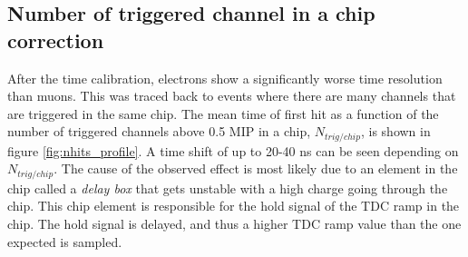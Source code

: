 \documentclass{JINST}
\begin{document}
\subsection{Number of triggered channel in a chip correction}
\label{sec:NumberTrigger}

After the time calibration, electrons show a significantly worse time resolution than muons. This was traced back to events where there are many channels that are triggered in the same chip. The mean time of first hit as a function of the number of triggered channels above 0.5 MIP in a chip, $N_{trig/chip}$, is shown in figure \ref{fig:nhits_profile}. A time shift of up to 20-40 ns can be seen depending on  $N_{trig/chip}$. The cause of the observed effect is most likely due to an element in the chip called a \textit{delay box} that gets unstable with a high charge going through the chip. This chip element is responsible for the hold signal of the TDC ramp in the chip. The hold signal is delayed, and thus a higher TDC ramp value than the one expected is sampled.
\end{document}
